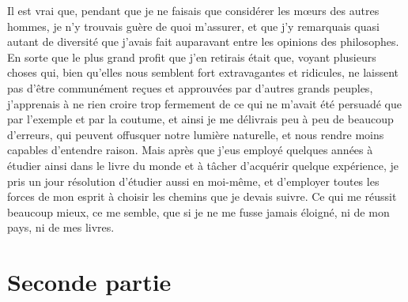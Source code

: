 \documentclass[french,twoside]{book} %
\newcommand\chapteropen{} %
\newcommand\chapterclose{} %
\begin{document}
Il est vrai que, pendant que je ne faisais que considérer les mœurs des autres hommes, je n'y trouvais guère de quoi m'assurer, et que j'y remarquais quasi autant de diversité que j'avais fait auparavant entre les opinions des philosophes. En sorte que le plus grand profit que j'en retirais était que, voyant plusieurs choses qui, bien qu'elles nous semblent fort extravagantes et ridicules, ne laissent pas d'être communément reçues et approuvées par d'autres grands peuples, j'apprenais à ne rien croire trop fermement de ce qui ne m'avait été persuadé que par l'exemple et par la coutume, et ainsi je me délivrais peu à peu de beaucoup d'erreurs, qui peuvent offusquer notre lumière naturelle, et nous rendre moins capables d'entendre raison. Mais après que j'eus employé quelques années à étudier ainsi dans le livre du monde et à tâcher d'acquérir quelque expérience, je pris un jour résolution d'étudier aussi en moi-même, et d'employer toutes les forces de mon esprit à choisir les chemins que je devais suivre. Ce qui me réussit beaucoup mieux, ce me semble, que si je ne me fusse jamais éloigné, ni de mon pays, ni de mes livres.
\chapterclose


\chapteropen
\renewcommand{\leftmark}{Seconde partie}
\chapter[Seconde partie]{Seconde partie}
\end{document}
